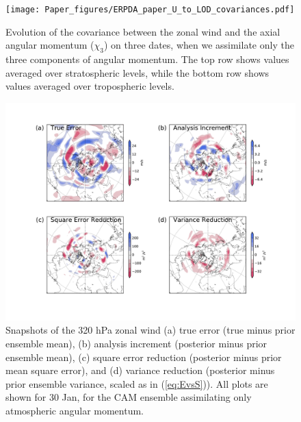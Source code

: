  \begin{figure}
	 \texttt{[image: Paper\_figures/ERPDA\_paper\_U\_to\_LOD\_covariances.pdf]}
	 \caption{Evolution of the covariance between the zonal wind and the axial angular momentum ($\chi_3$) on three dates, when we assimilate only the three components of angular momentum. The top row shows values averaged over stratospheric levels, while the bottom row shows values averaged over tropospheric levels.}
 \label{fig:covariances}
\end{figure}

 \begin{figure}
	 \includegraphics[width=\textwidth]{Paper_figures/ERPDA_paper_U_priorerror_vs_increment_vs_ER_30jan.pdf}
	 \caption{Snapshots of the 320 hPa zonal wind (a) true error (true minus prior ensemble mean), (b) analysis increment (posterior minus prior ensemble mean), (c) square error reduction (posterior minus prior mean square error), and (d) variance reduction (posterior minus prior ensemble variance, scaled as in (\ref{eq:EvsS})). All plots are shown for 30 Jan, for the CAM ensemble assimilating only atmospheric angular momentum. } 
 \label{fig:error_increments}
\end{figure}

